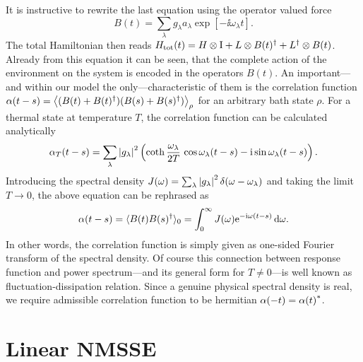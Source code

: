 It is instructive to rewrite the last equation using the operator valued force
\begin{equation}
  B(t)=\sum_\lambda g_\lambda a_\lambda \exp[-\ii\omega_\lambda t].
  \label{eq:nmqsd.force_operator}
\end{equation}
The total Hamiltonian then reads $H_\mathrm{tot}(t) = H \otimes \mathrm{I}  +  L \otimes B(t)^\dagger  +  L^\dagger \otimes B(t)$.
Already from this equation it can be seen, that the complete action of the environment on the system is encoded in the operators $B(t)$.
An important---and within our model the only---characteristic of them is the correlation function $\alpha(t-s) = \big\langle  (B(t) + B(t)^\dagger)(B(s) + B(s)^\dagger) \big\rangle_\rho$ for an arbitrary bath state $\rho$.
For a thermal state at temperature $T$, the correlation function can be calculated analytically \cite{FeHi10_path_integrals}
\begin{equation}
  \alpha_T(t - s) = \sum_\lambda  \left\vert g_\lambda \right\vert^2  \left( \operatorname{coth} \frac{\omega_\lambda}{2T} \, \cos \omega_\lambda (t-s)  -  \mathrm{i} \sin \omega_\lambda(t-s) \right).
  \label{eq:nmqsd.thermal_correlation_function}
\end{equation}
Introducing the spectral density $J(\omega) = \sum_\lambda \left\vert g_\lambda \right\vert^2 \delta(\omega - \omega_\lambda)$ and taking the limit $T \to 0$, the above equation can be rephrased as
\begin{equation}
  \alpha(t - s) = \qmean{B(t)\adj{B(s)}}_0 = \int_0^\infty J(\omega) \exp[-\ii\omega (t-s)] \dd \omega.
  \label{eq:nmqsd.correlation_function}
\end{equation}
In other words, the correlation function is simply given as one-sided Fourier transform of the spectral density.
Of course this connection between response function and power spectrum---and its general form for $T\neq0$---is well known as fluctuation-dissipation relation.
Since a genuine physical spectral density is real, we require admissible correlation function to be hermitian $\alpha(-t) = {\alpha(t)}^*$.\\



\section{Linear NMSSE}
\label{sec:nmqsd.lin_nmsse}
%
%

